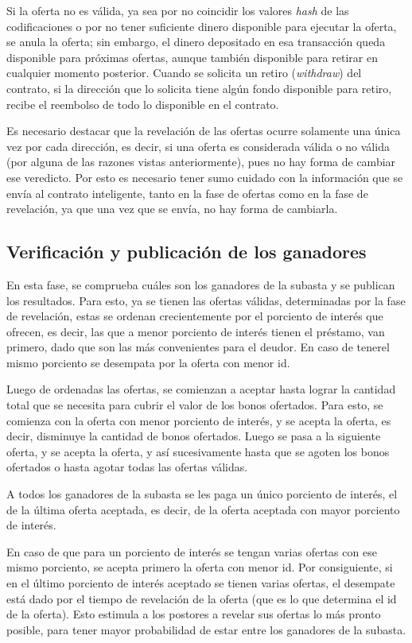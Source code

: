     Si la oferta no es válida, ya sea por no coincidir los valores \textit{hash} de las codificaciones o por no tener suficiente dinero disponible para ejecutar la oferta, se anula la oferta; sin embargo, el dinero depositado en esa transacción queda disponible para próximas ofertas, aunque también disponible para retirar en cualquier momento posterior. Cuando se solicita un retiro (\textit{withdraw}) del contrato, si la dirección que lo solicita tiene algún fondo disponible para retiro, recibe el reembolso de todo lo disponible en el contrato.

    Es necesario destacar que la revelación de las ofertas ocurre solamente una única vez por cada dirección, es decir, si una oferta es considerada válida o no válida (por alguna de las razones vistas anteriormente), pues no hay forma de cambiar ese veredicto. Por esto es necesario tener sumo cuidado con la información que se envía al contrato inteligente, tanto en la fase de ofertas como en la fase de revelación, ya que una vez que se envía, no hay forma de cambiarla.

  \subsection{Verificación y publicación de los ganadores}
    En esta fase, se comprueba cuáles son los ganadores de la subasta y se publican los resultados. Para esto, ya se tienen las ofertas válidas, determinadas por la fase de revelación, estas se ordenan crecientemente por el porciento de interés que ofrecen, es decir, las que a menor porciento de interés tienen el préstamo, van primero, dado que son las más convenientes para el deudor. En caso de tenerel mismo porciento se desempata por la oferta con menor id. 

    Luego de ordenadas las ofertas, se comienzan a aceptar hasta lograr la cantidad total que se necesita para cubrir el valor
    de los bonos ofertados. Para esto, se comienza con la oferta con menor porciento de interés, 
    y se acepta la oferta, es decir, disminuye la cantidad de bonos ofertados. Luego se pasa a la siguiente oferta, y se acepta la oferta, 
    y así sucesivamente hasta que se agoten los bonos ofertados o hasta agotar todas las ofertas válidas.

    A todos los ganadores de la subasta se les paga un único porciento de interés, el de la última oferta aceptada, es decir, de la oferta aceptada con mayor porciento de interés.

    En caso de que para un porciento de interés se tengan varias ofertas con ese mismo porciento, se acepta primero la oferta con menor id. Por consiguiente, si en el último porciento de interés aceptado se tienen varias ofertas, el desempate está dado por el tiempo de revelación de la oferta (que es lo que determina el id de la oferta). Esto estimula a los postores a revelar sus ofertas lo más pronto posible, para tener mayor probabilidad de estar entre los ganadores de la subasta.

